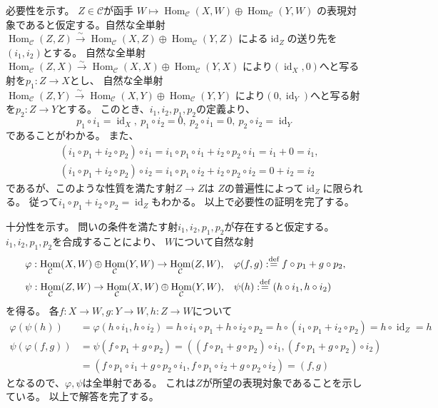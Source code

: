 \documentclass[uplatex,dvipdfmx]{jsarticle}
\makeatletter
\theoremstyle{definition}
\renewenvironment{proof}[1][\proofname]{
  \pushQED{\qed}%
  \normalfont \topsep6\p@\@plus6\p@\relax
  \trivlist
  \item[\hskip\labelsep
    #1\@addpunct{\textbf{.}}]\ignorespaces
}{%
  \popQED\endtrivlist\@endpefalse
}
\providecommand{\proofname}{証明}
\DeclareMathOperator{\Hom}{\mathrm{Hom}}
\DeclareMathOperator{\id}{\mathrm{id}}
\newcommand\mcC{\mathcal{C}}
\def\dfn{:\overset{\mbox{{\scriptsize def}}}{=}}
\makeatother
\begin{document}
\begin{proof}
  必要性を示す。
  \(Z\in \mcC\)が函手
  \(W\mapsto \Hom_{\mcC}(X,W)\oplus \Hom_{\mcC}(Y,W)\)
  の表現対象であると仮定する。自然な全単射
  \(\Hom_{\mcC}(Z,Z) \xrightarrow{\sim} \Hom_{\mcC}(X,Z)\oplus \Hom_{\mcC}(Y,Z)\)
  による\(\id_Z\)の送り先を\((i_1,i_2)\)とする。
  自然な全単射
  \(\Hom_{\mcC}(Z,X) \xrightarrow{\sim} \Hom_{\mcC}(X,X)\oplus \Hom_{\mcC}(Y,X)\)
  により\((\id_X,0)\)へと写る射を\(p_1:Z\to X\)とし、
  自然な全単射
  \(\Hom_{\mcC}(Z,Y) \xrightarrow{\sim} \Hom_{\mcC}(X,Y)\oplus \Hom_{\mcC}(Y,Y)\)
  により\((0,\id_Y)\)へと写る射を\(p_2:Z\to Y\)とする。
  このとき、\(i_1,i_2,p_1,p_2\)の定義より、
  \[
  p_1\circ i_1 = \id_X, \ p_1\circ i_2 = 0, \
  p_2\circ i_1 = 0, \ p_2\circ i_2 = \id_Y
  \]
  であることがわかる。
  また、
  \begin{align*}
    &(i_1\circ p_1 + i_2\circ p_2) \circ i_1
    = i_1\circ p_1 \circ i_1 + i_2\circ p_2 \circ i_1
    = i_1 + 0 = i_1, \\
    &(i_1\circ p_1 + i_2\circ p_2) \circ i_2
    = i_1\circ p_1 \circ i_2 + i_2\circ p_2 \circ i_2
    = 0 + i_2 = i_2
  \end{align*}
  であるが、このような性質を満たす射\(Z\to Z\)は
  \(Z\)の普遍性によって\(\id_Z\)に限られる。
  従って\(i_1\circ p_1 + i_2\circ p_2 = \id_Z\)もわかる。
  以上で必要性の証明を完了する。

  十分性を示す。
  問いの条件を満たす射\(i_1,i_2,p_1,p_2\)が存在すると仮定する。
  \(i_1,i_2,p_1,p_2\)を合成することにより、
  \(W\)について自然な射
  \begin{align*}
    &\varphi: \Hom_{\mcC}(X,W) \oplus \Hom_{\mcC}(Y,W) \to \Hom_{\mcC}(Z,W),
    &&\varphi(f,g) \dfn f\circ p_1 + g\circ p_2, \\
    &\psi: \Hom_{\mcC}(Z,W) \to \Hom_{\mcC}(X,W) \oplus \Hom_{\mcC}(Y,W),
    &&\psi(h) \dfn (h\circ i_1, h\circ i_2) \\
  \end{align*}
  を得る。
  各\(f:X\to W, g:Y\to W, h:Z\to W\)について
  \begin{align*}
    \varphi(\psi(h)) &= \varphi(h\circ i_1, h\circ i_2)
    = h\circ i_1 \circ p_1 + h\circ i_2\circ p_2
    = h\circ (i_1 \circ p_1 + i_2 \circ p_2) = h\circ \id_Z = h \\
    \psi(\varphi(f,g)) &= \psi(f\circ p_1 + g\circ p_2)
    = ((f\circ p_1 + g\circ p_2)\circ i_1, (f\circ p_1 + g\circ p_2)\circ i_2) \\
    &= (f\circ p_1\circ i_1 + g\circ p_2\circ i_1,
    f\circ p_1\circ i_2 + g\circ p_2 \circ i_2)
    = (f,g)
  \end{align*}
  となるので、\(\varphi,\psi\)は全単射である。
  これは\(Z\)が所望の表現対象であることを示している。
  以上で解答を完了する。
\end{proof}
\end{document}

